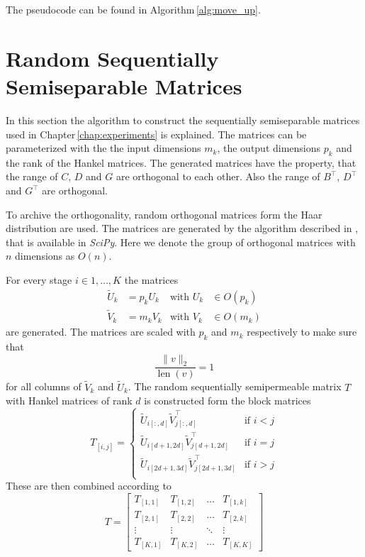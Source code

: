 \documentclass[numbers=noenddot,doctype=mastersthesis,BCOR=15mm,biblatex]{ldvbook}%
\DeclareMathOperator{\length}{len}
\begin{document}
The pseudocode can be found in Algorithm\,\ref{alg:move_up}.

\chapter{Random Sequentially Semiseparable Matrices}\label{A:random_T}

In this section the algorithm to construct the sequentially semiseparable matrices used in Chapter\,\ref{chap:experiments} is explained.
The matrices can be parameterized with the the input dimensions $m_k$, the output dimensions $p_k$ and the rank of the  Hankel matrices.
The generated matrices have the property, that the range of $C$, $D$ and $G$ are orthogonal to each other.
Also the range of $B^\top$, $D^\top$ and $G^\top$ are orthogonal.


To archive the orthogonality, random orthogonal matrices form the Haar distribution are used.
The matrices are generated by the algorithm described in \cite{mezzadri_how_2007}, that is available in \emph{SciPy}.
Here we denote the group of orthogonal matrices with $n$ dimensions as $O(n)$.

For every stage $i \in 1, \dots ,K$ the matrices 
\begin{align}
	\tilde{U}_k &=p_k U_k  & \text{with } U_k &\in O(p_k)\\
	\tilde{V}_k &=m_k V_k  & \text{with } V_k &\in O(m_k)
\end{align}
are generated.
The matrices are scaled with $p_k$ and $m_k$ respectively to make sure that 
\begin{equation}
	\frac{\|v\|_2}{\length(v)} = 1  
\end{equation}
for all columns of $\tilde{V}_k$ and $\tilde{U}_k$.
The random sequentially semipermeable matrix $T$ with Hankel matrices of rank $d$ is constructed form the block matrices 
\begin{equation}
	T_{[i,j]} = 
	\begin{cases}
	\tilde{U}_{i[:,d]} \tilde{V}_{j[:,d]}^\top & \text{if } i<j\\
	\tilde{U}_{i[d+1,2d]} \tilde{V}_{j[d+1,2d]}^\top & \text{if } i=j\\
	\tilde{U}_{i[2d+1,3d]} \tilde{V}_{j[2d+1,3d]}^\top & \text{if } i>j\\
	\end{cases}
\end{equation}
These are then combined according to 
\begin{equation}
	T = \begin{bmatrix}
	T_{[1,1]} & T_{[1,2]} & \dots & T_{[1,k]}\\
	T_{[2,1]} & T_{[2,2]} & \dots & T_{[2,k]}\\
	\vdots & \vdots & \ddots &\vdots\\
	T_{[K,1]} & T_{[K,2]} & \dots & T_{[K,K]}
	\end{bmatrix}
\end{equation}

\printbibliography{}
\end{document}
